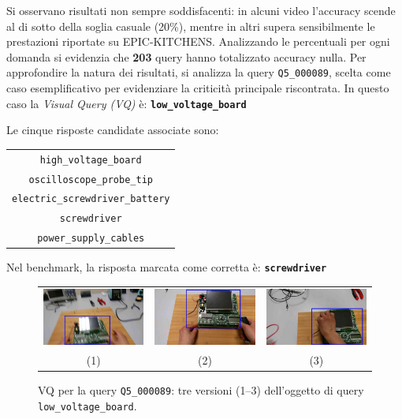 Si osservano risultati non sempre soddisfacenti: in alcuni video l'accuracy scende al di sotto della soglia casuale (20\%), 
mentre in altri supera sensibilmente le prestazioni riportate su EPIC-KITCHENS. 
Analizzando le percentuali per ogni domanda si evidenzia che \textbf{203} query hanno totalizzato accuracy nulla. 
Per approfondire la natura dei risultati, si analizza la query \texttt{Q5\_000089}, scelta come caso esemplificativo per evidenziare la criticità principale riscontrata.
In questo caso la \emph{Visual Query (VQ)} è: \textbf{\texttt{low\_voltage\_board}}

Le cinque risposte candidate associate sono:  

\begin{center}
\begin{tabular}{|c|}
\hline
\texttt{high\_voltage\_board} \\
\texttt{oscilloscope\_probe\_tip} \\
\texttt{electric\_screwdriver\_battery} \\
\texttt{screwdriver} \\
\texttt{power\_supply\_cables} \\
\hline
\end{tabular}
\end{center}

Nel benchmark, la risposta marcata come corretta è: \textbf{\texttt{screwdriver}}

\begin{figure}[ht]
    \centering
    \setlength{\tabcolsep}{4pt}
    \begin{tabular}{ccc}
        \includegraphics[width=0.31\linewidth]{Images/zeroaccvq1.jpg} &
        \includegraphics[width=0.31\linewidth]{Images/zeroaccvq2.jpg} &
        \includegraphics[width=0.31\linewidth]{Images/zeroaccvq3.jpg} \\
        (1) & (2) & (3)
    \end{tabular}
    \caption{VQ per la query \texttt{Q5\_000089}: tre versioni (1–3) dell'oggetto di query \texttt{low\_voltage\_board}.}
    \label{fig:vq_zero_acc}
\end{figure}


